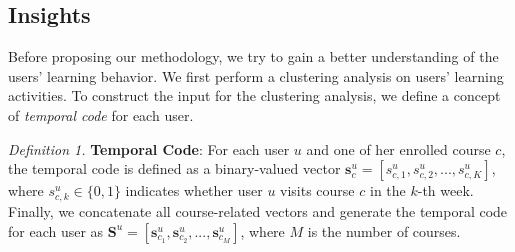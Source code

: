     
\subsection{Insights} 
    \label{sec:temporal}
     
    Before proposing our methodology, we try to gain a better understanding of the users' learning behavior.
    We first perform a clustering analysis on users' learning activities. To construct the input for the clustering analysis, we define a concept of \textit{temporal code} for each user. 
    
    \emph{Definition 1.} \textbf{Temporal Code}:
    For each user $u$ and one of her enrolled course $c$, the temporal code is defined as a binary-valued vector $\mathbf{s}^u_{c}=[s^u_{c,1}, s^u_{c,2},..., s^u_{c,K}]$, where $s^u_{c,k} \in \{0,1\}$ indicates whether user $u$ visits course $c$ in the $k$-th week. Finally, we concatenate all course-related vectors and generate the temporal code for each user 
    as $\mathbf{S}^u=[\mathbf{s}^u_{c_1}, \mathbf{s}^u_{c_2},..., \mathbf{s}^u_{c_M}]$, where $M$ is the number of courses.
    
